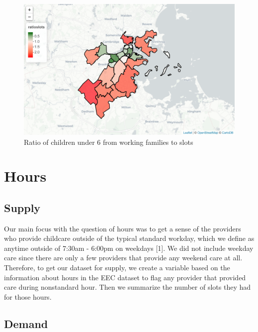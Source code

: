 \documentclass[10pt,letterpaper]{article}
\begin{document}
\begin{figure}

{\centering \includegraphics[width=1\linewidth]{fig3} 

}

\caption{Ratio of children under 6 from working families to slots}\label{fig:unnamed-chunk-6}
\end{figure}

\section{Hours}\label{hours}

\subsection{Supply}\label{supply-1}

Our main focus with the question of hours was to get a sense of the
providers who provide childcare outside of the typical standard workday,
which we define as anytime outside of 7:30am - 6:00pm on weekdays
{[}1{]}. We did not include weekday care since there are only a few
providers that provide any weekend care at all. Therefore, to get our
dataset for supply, we create a variable based on the information about
hours in the EEC dataset to flag any provider that provided care during
nonstandard hour. Then we summarize the number of slots they had for
those hours.

\subsection{Demand}\label{demand-1}
\end{document}
